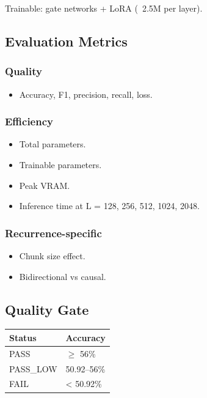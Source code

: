 Trainable: gate networks + LoRA (~2.5M per layer).

\subsection{Evaluation Metrics}

\subsubsection{Quality}
\begin{itemize}
\item Accuracy, F1, precision, recall, loss.

\end{itemize}
\subsubsection{Efficiency}
\begin{itemize}
\item Total parameters.
\item Trainable parameters.
\item Peak VRAM.
\item Inference time at L = 128, 256, 512, 1024, 2048.

\end{itemize}
\subsubsection{Recurrence-specific}
\begin{itemize}
\item Chunk size effect.
\item Bidirectional vs causal.

\end{itemize}
\subsection{Quality Gate}

\begin{table}[H]
\centering
\small
\begin{tabular}{ll}
\toprule
\textbf{Status} & \textbf{Accuracy} \\
\midrule
PASS & $\ge$ 56\% \\
PASS\_LOW & 50.92--56\% \\
FAIL & \textless{} 50.92\% \\
\bottomrule
\end{tabular}
\end{table}

